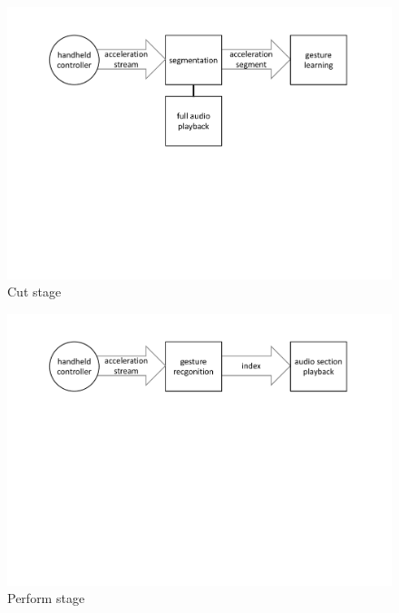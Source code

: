 \documentclass{nime-alternate_ADJ} %
\begin{document}
\begin{figure}[t!]
	\centering
		\includegraphics[trim={3.2cm 10.2cm 3.2cm 2.1cm}, clip=true, width=1\columnwidth]{cut}
	\caption{Cut stage}
	\label{fig_3}
\end{figure}

\begin{figure}[t!]
	\centering
		\includegraphics[trim={3.2cm 14.9cm 3.2cm 2.1cm}, clip=true, width=1\columnwidth]{perform}
	\caption{Perform stage}
	\label{fig_4}
\end{figure}
\end{document}
